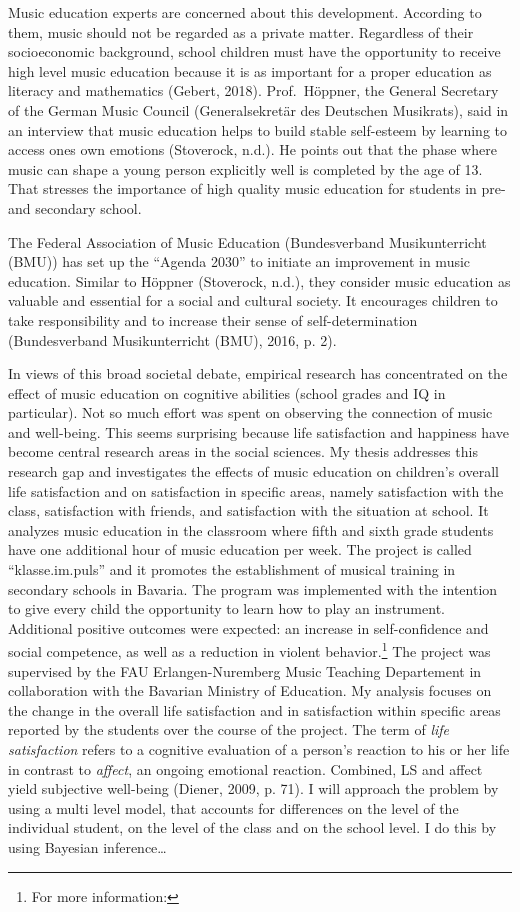 \documentclass[a4, 12pt]{article}
\let\rmarkdownfootnote\footnote%
\def\footnote{\protect\rmarkdownfootnote}
\begin{document}
Music education experts are concerned about this development. According to them, music should not be regarded as a private matter. Regardless of their socioeconomic background, school children must have the opportunity to receive high level music education because it is as important for a proper education as literacy and mathematics (Gebert, 2018). Prof.~Höppner, the General Secretary of the German Music Council (Generalsekretär des Deutschen Musikrats), said in an interview that music education helps to build stable self-esteem by learning to access ones own emotions (Stoverock, n.d.). He points out that the phase where music can shape a young person explicitly well is completed by the age of 13. That stresses the importance of high quality music education for students in pre- and secondary school.

The Federal Association of Music Education (Bundesverband Musikunterricht (BMU)) has set up the ``Agenda 2030'' to initiate an improvement in music education. Similar to Höppner (Stoverock, n.d.), they consider music education as valuable and essential for a social and cultural society. It encourages children to take responsibility and to increase their sense of self-determination (Bundesverband Musikunterricht (BMU), 2016, p. 2).

In views of this broad societal debate, empirical research has concentrated on the effect of music education on cognitive abilities (school grades and IQ in particular). Not so much effort was spent on observing the connection of music and well-being. This seems surprising because life satisfaction and happiness have become central research areas in the social sciences. My thesis addresses this research gap and investigates the effects of music education on children's overall life satisfaction and on satisfaction in specific areas, namely satisfaction with the class, satisfaction with friends, and satisfaction with the situation at school. It analyzes music education in the classroom where fifth and sixth grade students have one additional hour of music education per week. The project is called ``klasse.im.puls'' and it promotes the establishment of musical training in secondary schools in Bavaria. The program was implemented with the intention to give every child the opportunity to learn how to play an instrument. Additional positive outcomes were expected: an increase in self-confidence and social competence, as well as a reduction in violent behavior.\footnote{For more information:} The project was supervised by the FAU Erlangen-Nuremberg Music Teaching Departement in collaboration with the Bavarian Ministry of Education.
My analysis focuses on the change in the overall life satisfaction and in satisfaction within specific areas reported by the students over the course of the project. The term of \emph{life satisfaction} refers to a cognitive evaluation of a person's reaction to his or her life in contrast to \emph{affect}, an ongoing emotional reaction. Combined, LS and affect yield subjective well-being (Diener, 2009, p. 71). I will approach the problem by using a multi level model, that accounts for differences on the level of the individual student, on the level of the class and on the school level. I do this by using Bayesian inference\ldots{}
\end{document}
